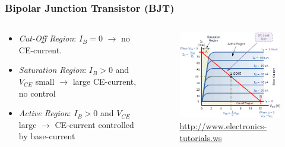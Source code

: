 \documentclass{beamer}
\begin{document}
\begin{frame}\frametitle{Bipolar Junction Transistor (BJT)} 
\begin{columns}
\begin{column}{6cm}
\begin{itemize}
\item \textit{Cut-Off Region}: $I_B=0$ $\rightarrow$ no CE-current. 

\item \textit{Saturation Region}: $I_B>0$ and $V_{CE}$ small $\rightarrow$ large CE-current, no control 

\item \textit{Active Region}: $I_B>0$ and $V_{CE}$ large $\rightarrow$ CE-current controlled by base-current

\end{itemize}
\end{column}
\begin{column}{5cm}
\begin{figure}[H]
\centering
\includegraphics[width=1.1\textwidth]{kenn_npn}
\caption{\url{http://www.electronics-tutorials.ws}}%
\end{figure}
\end{column}
\end{columns}
\end{frame}
\end{document}
